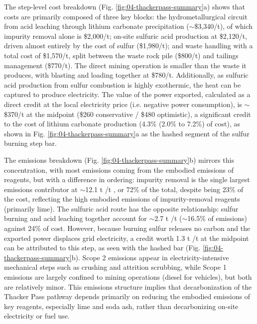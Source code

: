 \documentclass{article}
\renewcommand\_{\textunderscore\allowbreak}
\begin{document}
The step-level cost breakdown (Fig. \ref{fig:04-thackerpass-summary}a) shows that costs are primarily composed of three key blocks: the hydrometallurgical circuit from acid leaching through lithium carbonate precipitation ($\sim$\$3,340/t), of which impurity removal alone is \$2,000/t; on-site sulfuric acid production at \$2,120/t,
driven almost entirely by the cost of sulfur (\$1,980/t); and waste handling with a total cost of \$1,570/t, split between the waste rock pile (\$800/t) and tailings management (\$770/t). The direct mining operation is smaller than the waste it produces, with blasting and loading together at \$780/t. Additionally, as sulfuric acid production from sulfur combustion is highly exothermic, the heat can be captured to produce electricity. The value of the power exported, calculated as a direct credit at the local electricity price (i.e. negative power consumption), is $\sim$\$370/t  at the midpoint (\$260 conservative / \$480 optimistic), a significant credit to the cost of lithium carbonate production (4.3\% (2.0\% to 7.2\%) of cost), as shown in Fig. \ref{fig:04-thackerpass-summary}a as the hashed segment of the sulfur burning step bar. 

The emissions breakdown (Fig. \ref{fig:04-thackerpass-summary}b) mirrors this concentration, with most emissions coming from the embodied emissions of reagents, but with a difference in ordering: impurity removal is the single largest emissions contributor at $\sim$12.1 t /t , or 72\% of the total, despite being 23\% of the cost, reflecting the high embodied emissions of impurity-removal reagents (primarily lime). The sulfuric acid route has the opposite relationship:  sulfur burning and acid leaching together account for $\sim$2.7 t /t ($\sim$16.5\% of emissions) against 24\% of cost. However, because burning sulfur releases no carbon and the exported power displaces grid electricity, a credit worth 1.3 t /t at the midpoint can be attributed to this step, as seen with the hashed bar (Fig. \ref{fig:04-thackerpass-summary}b). Scope 2 emissions appear in electricity-intensive mechanical steps such as crushing and attrition scrubbing, while Scope 1 emissions are largely confined to mining operations (diesel for vehicles), but both are relatively minor. This emissions structure implies that decarbonization of the Thacker Pass pathway depends primarily on reducing the embodied emissions of key reagents, especially lime and soda ash, rather than decarbonizing on-site electricity or fuel use. 
\end{document}
